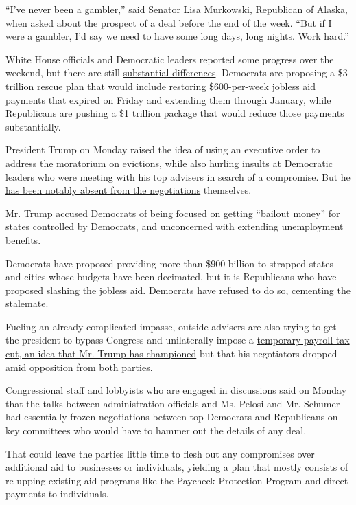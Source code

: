``I've never been a gambler,'' said Senator Lisa Murkowski, Republican
of Alaska, when asked about the prospect of a deal before the end of the
week. ``But if I were a gambler, I'd say we need to have some long days,
long nights. Work hard.''

White House officials and Democratic leaders reported some progress over
the weekend, but there are still
\href{https://www.nytimes.com/2020/08/02/us/politics/coronavirus-jobless-aid.html}{substantial
differences}. Democrats are proposing a \$3 trillion rescue plan that
would include restoring \$600-per-week jobless aid payments that expired
on Friday and extending them through January, while Republicans are
pushing a \$1 trillion package that would reduce those payments
substantially.

President Trump on Monday raised the idea of using an executive order to
address the moratorium on evictions, while also hurling insults at
Democratic leaders who were meeting with his top advisers in search of a
compromise. But he
\href{https://www.nytimes.com/2020/08/03/us/politics/congress-jobless-aid-talks-trump.html}{has
been notably absent from the negotiations} themselves.

Mr. Trump accused Democrats of being focused on getting ``bailout
money'' for states controlled by Democrats, and unconcerned with
extending unemployment benefits.

Democrats have proposed providing more than \$900 billion to strapped
states and cities whose budgets have been decimated, but it is
Republicans who have proposed slashing the jobless aid. Democrats have
refused to do so, cementing the stalemate.

Fueling an already complicated impasse, outside advisers are also trying
to get the president to bypass Congress and unilaterally impose a
\href{https://www.nytimes.com/2020/07/23/business/payroll-tax-cut-trump-recession.html}{temporary
payroll tax cut, an idea that Mr. Trump has championed} but that his
negotiators dropped amid opposition from both parties.

Congressional staff and lobbyists who are engaged in discussions said on
Monday that the talks between administration officials and Ms. Pelosi
and Mr. Schumer had essentially frozen negotiations between top
Democrats and Republicans on key committees who would have to hammer out
the details of any deal.

That could leave the parties little time to flesh out any compromises
over additional aid to businesses or individuals, yielding a plan that
mostly consists of re-upping existing aid programs like the Paycheck
Protection Program and direct payments to individuals.

